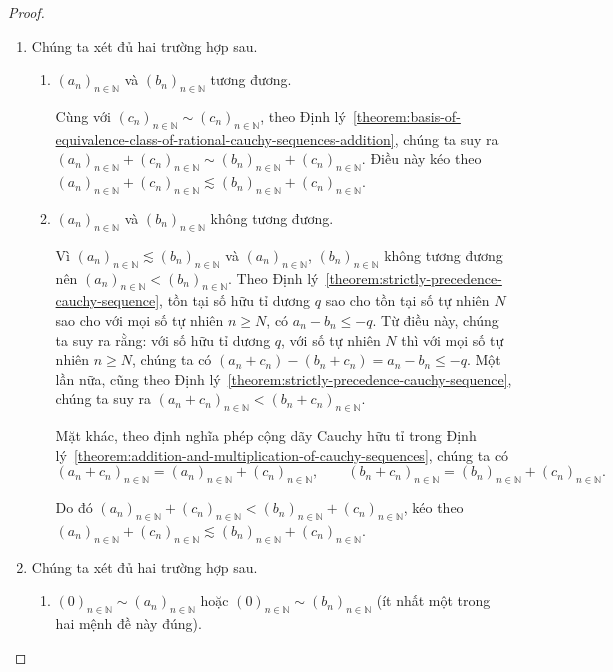 \begin{proof}
    \begin{enumerate}[label={(\roman*)}]
        \item Chúng ta xét đủ hai trường hợp sau.
              \begin{enumerate}[label={\textbf{Trường hợp \arabic*.}},itemindent=1cm]
                  \item ${(a_{n})}_{n\in\mathbb{N}}$ và ${(b_{n})}_{n\in\mathbb{N}}$ tương đương.

                        Cùng với ${(c_{n})}_{n\in\mathbb{N}}\sim {(c_{n})}_{n\in\mathbb{N}}$, theo Định lý~\ref{theorem:basis-of-equivalence-class-of-rational-cauchy-sequences-addition}, chúng ta suy ra ${(a_{n})}_{n\in\mathbb{N}} + {(c_{n})}_{n\in\mathbb{N}}\sim {(b_{n})}_{n\in\mathbb{N}} + {(c_{n})}_{n\in\mathbb{N}}$. Điều này kéo theo ${(a_{n})}_{n\in\mathbb{N}} + {(c_{n})}_{n\in\mathbb{N}}\lesssim {(b_{n})}_{n\in\mathbb{N}} + {(c_{n})}_{n\in\mathbb{N}}$.
                  \item ${(a_{n})}_{n\in\mathbb{N}}$ và ${(b_{n})}_{n\in\mathbb{N}}$ không tương đương.

                        Vì ${(a_{n})}_{n\in\mathbb{N}}\lesssim {(b_{n})}_{n\in\mathbb{N}}$ và ${(a_{n})}_{n\in\mathbb{N}}$, ${(b_{n})}_{n\in\mathbb{N}}$ không tương đương nên ${(a_{n})}_{n\in\mathbb{N}} < {(b_{n})}_{n\in\mathbb{N}}$. Theo Định lý~\ref{theorem:strictly-precedence-cauchy-sequence}, tồn tại số hữu tỉ dương $q$ sao cho tồn tại số tự nhiên $N$ sao cho với mọi số tự nhiên $n\geq N$, có $a_{n} - b_{n}\leq -q$. Từ điều này, chúng ta suy ra rằng: với số hữu tỉ dương $q$, với số tự nhiên $N$ thì với mọi số tự nhiên $n\geq N$, chúng ta có $(a_{n} + c_{n}) - (b_{n} + c_{n}) = a_{n} - b_{n}\leq -q$. Một lần nữa, cũng theo Định lý~\ref{theorem:strictly-precedence-cauchy-sequence}, chúng ta suy ra ${(a_{n} + c_{n})}_{n\in\mathbb{N}} < {(b_{n} + c_{n})}_{n\in\mathbb{N}}$.

                        Mặt khác, theo định nghĩa phép cộng dãy Cauchy hữu tỉ trong Định lý~\ref{theorem:addition-and-multiplication-of-cauchy-sequences}, chúng ta có
                        \[
                            {(a_{n} + c_{n})}_{n\in\mathbb{N}} = {(a_{n})}_{n\in\mathbb{N}} + {(c_{n})}_{n\in\mathbb{N}},\qquad  {(b_{n} + c_{n})}_{n\in\mathbb{N}} = {(b_{n})}_{n\in\mathbb{N}} + {(c_{n})}_{n\in\mathbb{N}}.
                        \]

                        Do đó ${(a_{n})}_{n\in\mathbb{N}} + {(c_{n})}_{n\in\mathbb{N}} < {(b_{n})}_{n\in\mathbb{N}} + {(c_{n})}_{n\in\mathbb{N}}$, kéo theo ${(a_{n})}_{n\in\mathbb{N}} + {(c_{n})}_{n\in\mathbb{N}}\lesssim {(b_{n})}_{n\in\mathbb{N}} + {(c_{n})}_{n\in\mathbb{N}}$.
              \end{enumerate}
        \item Chúng ta xét đủ hai trường hợp sau.
              \begin{enumerate}[label={\textbf{Trường hợp \arabic*.}},itemindent=1cm]
                  \item ${(0)}_{n\in\mathbb{N}}\sim {(a_{n})}_{n\in\mathbb{N}}$ hoặc ${(0)}_{n\in\mathbb{N}} \sim {(b_{n})}_{n\in\mathbb{N}}$ (ít nhất một trong hai mệnh đề này đúng).


\end{enumerate}
\end{enumerate}
\end{proof}

